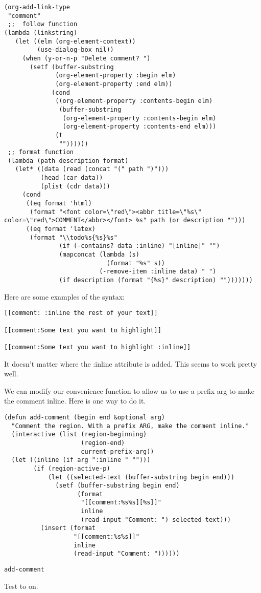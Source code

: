 \documentclass[11pt]{article}
\begin{document}
\begin{verbatim}
(org-add-link-type
 "comment"
 ;;  follow function
(lambda (linkstring)
   (let ((elm (org-element-context))
         (use-dialog-box nil))
     (when (y-or-n-p "Delete comment? ")
       (setf (buffer-substring
              (org-element-property :begin elm)
              (org-element-property :end elm))
             (cond
              ((org-element-property :contents-begin elm)
               (buffer-substring
                (org-element-property :contents-begin elm)
                (org-element-property :contents-end elm)))
              (t
               ""))))))
 ;; format function
 (lambda (path description format)
   (let* ((data (read (concat "(" path ")")))
          (head (car data))
          (plist (cdr data)))
     (cond
      ((eq format 'html)
       (format "<font color=\"red\"><abbr title=\"%s\" color=\"red\">COMMENT</abbr></font> %s" path (or description "")))
      ((eq format 'latex)
       (format "\\todo%s{%s}%s"
               (if (-contains? data :inline) "[inline]" "")
               (mapconcat (lambda (s)
                            (format "%s" s))
                          (-remove-item :inline data) " ")
               (if description (format "{%s}" description) "")))))))
\end{verbatim}

Here are some examples of the syntax:
\begin{verbatim}
[[comment: :inline the rest of your text]]

[[comment:Some text you want to highlight]]

[[comment:Some text you want to highlight :inline]]
\end{verbatim}

It doesn't matter where the :inline attribute is added. This seems to work pretty well.

We can modify our convenience function to allow us to use a prefix arg to make the comment inline. Here is one way to do it.

\begin{verbatim}
(defun add-comment (begin end &optional arg)
  "Comment the region. With a prefix ARG, make the comment inline."
  (interactive (list (region-beginning)
                     (region-end)
                     current-prefix-arg))
  (let ((inline (if arg ":inline " "")))
        (if (region-active-p)
            (let ((selected-text (buffer-substring begin end)))
              (setf (buffer-substring begin end)
                    (format
                     "[[comment:%s%s][%s]]"
                     inline
                     (read-input "Comment: ") selected-text)))
          (insert (format
                   "[[comment:%s%s]]"
                   inline
                   (read-input "Comment: "))))))
\end{verbatim}

\begin{verbatim}
add-comment
\end{verbatim}

Test  to   on.
\end{document}
